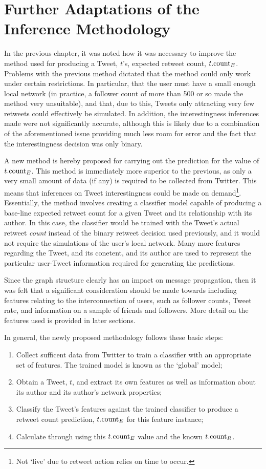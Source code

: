 \section{Further Adaptations of the Inference Methodology}
In the previous chapter, it was noted how it was necessary to improve the method used for producing a Tweet, $t$'s, expected retweet count, $t.\textrm{count}_E$. Problems with the previous method dictated that the method could only work under certain restrictions. In particular, that the user must have a small enough local network (in practice, a follower count of more than 500 or so made the method very unsuitable), and that, due to this, Tweets only attracting very few retweets could effectively be simulated. In addition, the interestingness inferences made were not significantly accurate, although this is likely due to a combination of the aforementioned issue providing much less room for error and the fact that the interestingness decision was only binary.

A new method is hereby proposed for carrying out the prediction for the value of $t.\textrm{count}_E$. This method is immediately more superior to the previous, as only a very small amount of data (if any) is required to be collected from Twitter. This means that inferences on Tweet interestingness could be made on demand\footnote{Not `live' due to retweet action relies on time to occur.}.\\
Essentially, the method involves creating a classifier model capable of producing a base-line expected retweet count for a given Tweet and its relationship with its author. In this case, the classifier would be trained with the Tweet's actual retweet \textit{count} instead of the binary retweet decision used previously, and it would not require the simulations of the user's local network. Many more features regarding the Tweet, and its conetent, and its author are used to represent the particular user-Tweet information required for generating the predictions.

Since the graph structure clearly has an impact on message propagation, then it was felt that a significant consideration should be made towards including features relating to the interconnection of users, such as follower counts, Tweet rate, and information on a sample of friends and followers. More detail on the features used is provided in later sections.

In general, the newly proposed methodology follows these basic steps:
\begin{enumerate}
    \item Collect sufficent data from Twitter to train a classifier with an appropriate set of features. The trained model is known as the `global' model;
    \item Obtain a Tweet, $t$, and extract its own features as well as information about its author and its author's network properties;
    \item Classify the Tweet's features against the trained classifier to produce a retweet count prediction, $t.\textrm{count}_E$ for this feature instance;
    \item Calculate  through using this $t.\textrm{count}_E$ value and the known $t.\textrm{count}_R$.
\end{enumerate}

